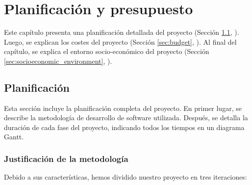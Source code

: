 \chead[]{}
\renewcommand{\headrulewidth}{0.5pt}

\lfoot[]{}
\cfoot[]{}
\rfoot[]{}
\renewcommand{\footrulewidth}{0pt}

\chapter{Planificación y presupuesto}
\label{ch:planning_and_budget}

Este capítulo presenta una planificación detallada del proyecto (Sección \ref{sec:planning}, \textit{}). Luego, se explican los costes del proyecto (Sección \ref{sec:budget}, \textit{}). Al final del capítulo, se explica el entorno socio-económico del proyecto ({Sección \ref{sec:socioeconomic_environment}, \textit{}}).

\section{Planificación}
\label{sec:planning}

Esta sección incluye la planificación completa del proyecto. En primer lugar, se describe la metodología de desarrollo de software utilizada. Después, se detalla la duración de cada fase del proyecto, indicando todos los tiempos en un diagrama Gantt.

\subsection{Justificación de la metodología}

Debido a sus características, hemos dividido nuestro proyecto en tres iteraciones:

